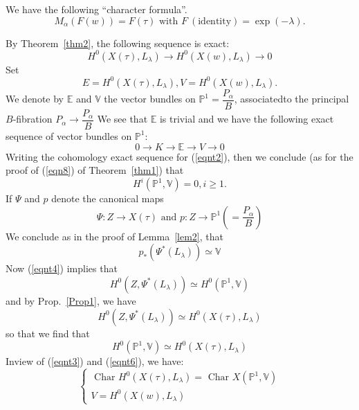 \begin{thm}\label{thm3}
We have the following ``character formula''. 
$$
M_{\alpha}(F(w))=F(\tau) \text{ with } F~ (\text{identity}) = \exp(-\lambda).
$$
\end{thm}

\begin{Proof}
By Theorem~\ref{thm2}, the following sequence is exact: 
\begin{equation*}
H^{0}(X(\tau), L_{\lambda})\to H^{0}(X(w), L_{\lambda})\to 0\tag{$\ast$}
\end{equation*}
Set
\begin{equation*}\label{eqnt1}
E=H^{0}(X(\tau), L_{\lambda}), V=H^{0}(X(w), L_{\lambda}).\tag{1}
\end{equation*}
We denote by $\mathbb{E}$ and $\mathbb{V}$ the vector bundles on $\mathbb{P}^{1}=\dfrac{P_{\alpha}}{B}$, associated\pageoriginale to the principal $B$-fibration $P_{\alpha}\to \dfrac{P_{\alpha}}{B}$ We see that $\mathbb{E}$ is trivial and we have the following exact sequence of vector bundles on $\mathbb{P}^{1}$:
\begin{equation*}\label{eqnt2}
0\to K\to \mathbb{E}\to V\to 0\tag{2}
\end{equation*}
Writing the cohomology exact sequence for (\ref{eqnt2}), then we conclude (as for the proof of (\ref{eqn8}) of Theorem~\ref{thm1}) that 
\begin{equation*}\label{eqnt3}
H^{i}\left(\mathbb{P}^{1}, \mathbb{V}\right)=0, i\geq 1.\tag{3}
\end{equation*}
If $\Psi$ and $p$ denote the canonical maps 
$$
\Psi:Z\to X(\tau) \text{ and } p:Z\to \mathbb{P}^{1}\left(=\dfrac{P_{\alpha}}{B}\right)
$$
We conclude as in the proof of Lemma~\ref{lem2}, that 
\begin{equation*}\label{eqnt4}
p_{\ast}\left(\Psi^{\ast}(L_{\lambda})\right)\simeq \mathbb{V}\tag{4}
\end{equation*}
Now (\ref{eqnt4}) implies that 
\begin{equation*}\label{eqnt5}
H^{0}\left(Z, \Psi^{\ast}(L_{\lambda})\right)\simeq H^{0}\left(\mathbb{P}^{1}, \mathbb{V}\right)\tag{5}
\end{equation*}
and by Prop.~\ref{Prop1}, we have 
$$
H^{0}\left(Z, \Psi^{\ast}(L_{\lambda})\right)\simeq H^{0}(X(\tau), L_{\lambda})
$$
so that we find that 
\begin{equation*}\label{eqnt6}
H^{0}\left(\mathbb{P}^{1}, \mathbb{V}\right)\simeq H^{0}(X(\tau), L_{\lambda})\tag{6}
\end{equation*}
In\pageoriginale view of (\ref{eqnt3}) and (\ref{eqnt6}), we have:
\begin{equation*}\label{eqnt7}
\begin{cases}
\text{ Char } H^{0}(X(\tau), L_{\lambda})=\text{ Char } X\left(\mathbb{P}^{1}, \mathbb{V}\right)\\
V=H^{0}(X(w), L_{\lambda})
\end{cases}\tag{7}
\end{equation*}


\end{Proof}
